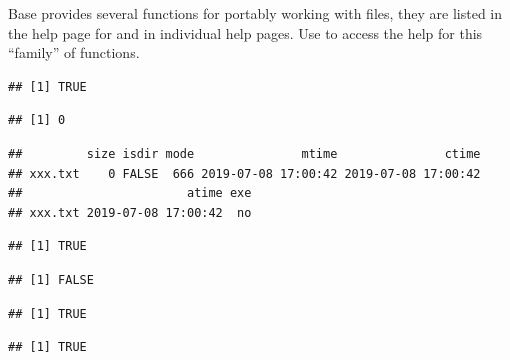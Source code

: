 \documentclass[krantz2]{krantz}\usepackage{knitr}%
\begin{document}
Base \Rlang provides several functions for portably working with files, they are listed in the help page for  and in individual help pages. Use  to access the help for this ``family'' of functions.

\begin{knitrout}\footnotesize
{}\color{fgcolor}\begin{kframe}
\begin{alltt}
 \hlstd{(}\hlopt{!}\hlstd{(}\hlstd{)) \{}
  \hlstd{(}\hlstd{)}
\hlstd{\}}
\end{alltt}
\begin{verbatim}
## [1] TRUE
\end{verbatim}
\begin{alltt}
\hlstd{(}\hlstd{)}
\end{alltt}
\begin{verbatim}
## [1] 0
\end{verbatim}
\begin{alltt}
\hlstd{(}\hlstd{)}
\end{alltt}
\begin{verbatim}
##         size isdir mode               mtime               ctime
## xxx.txt    0 FALSE  666 2019-07-08 17:00:42 2019-07-08 17:00:42
##                       atime exe
## xxx.txt 2019-07-08 17:00:42  no
\end{verbatim}
\begin{alltt}
\hlstd{(}\hlstd{,} \hlstd{)}
\end{alltt}
\begin{verbatim}
## [1] TRUE
\end{verbatim}
\begin{alltt}
\hlstd{(}\hlstd{)}
\end{alltt}
\begin{verbatim}
## [1] FALSE
\end{verbatim}
\begin{alltt}
\hlstd{(}\hlstd{)}
\end{alltt}
\begin{verbatim}
## [1] TRUE
\end{verbatim}
\begin{alltt}
\hlstd{(}\hlstd{)}
\end{alltt}
\begin{verbatim}
## [1] TRUE
\end{verbatim}
\end{kframe}
\end{knitrout}
\end{document}
